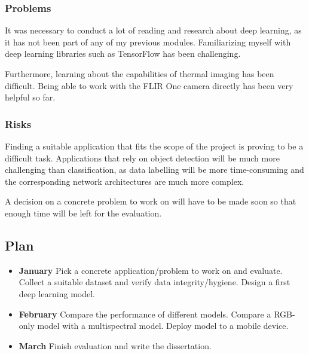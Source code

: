 \documentclass[11pt]{article}
\begin{document}
\subsubsection{Problems}\label{problems}

It was necessary to conduct a lot of reading and research about deep learning, as it has not been part of any of my previous modules. Familiarizing myself with deep learning libraries such as TensorFlow has been challenging.

Furthermore, learning about the capabilities of thermal imaging has been difficult. Being able to work with the FLIR One camera directly has been very helpful so far.

\subsubsection{Risks}\label{risks}

Finding a suitable application that fits the scope of the project is proving to be a difficult task. 
Applications that rely on object detection will be much more challenging than classification, as data labelling will be more time-consuming and the corresponding network architectures are much more complex.

A decision on a concrete problem to work on will have to be made soon so that enough time will be left for the evaluation.

\subsection{Plan}\label{plan}

\begin{itemize}
    \item \textbf{January} Pick a concrete application/problem to work on and evaluate. Collect a suitable dataset and verify data integrity/hygiene. Design a first deep learning model. 
    \item \textbf{February} Compare the performance of different models. Compare a RGB-only model with a multispectral model. Deploy model to a mobile device.
    \item \textbf{March} Finish evaluation and write the dissertation.
\end{itemize}
\end{document}
